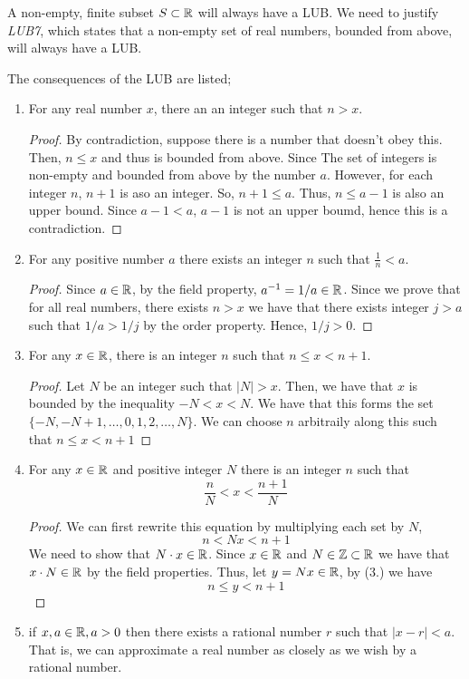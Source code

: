 A non-empty, finite subset $S \subset \mathbb{R}$ will always have a LUB. We need to justify \textit{LUB7}, which states that a non-empty set of real numbers, bounded from above, will always have a LUB. 

The consequences of the LUB are listed;
\begin{enumerate}[label=\arabic{*}.]
    \item For any real number $x$, there an an integer such that $n > x$. 
    \begin{proof}
        By contradiction, suppose there is a number that doesn't obey this. Then, $n \leq x$ and thus is bounded from above. Since The set of integers is non-empty and bounded from above by the number $a$. However, for each integer $n$, $n+1$ is aso an integer. So, $n + 1 \leq a$. Thus, $n \leq a-1$ is also an upper bound. Since $a -1 < a$, $a-1$ is not an upper boumd, hence this is a contradiction. 
    \end{proof}
    \item For any positive number $a$ there exists an integer $n$ such that $\frac{1}{n} < a$. 
    \begin{proof}
        Since $a \in \mathbb{R}$, by the field property, $a^{-1} = 1/a \in \mathbb{R}$. Since we prove that for all real numbers, there exists $n>x$ we have that there exists integer $j > a$ such that $1/a > 1/j$ by the order property. Hence, $1/j > 0$.
    \end{proof}
    \item For any $x\in \mathbb{R}$, there is an integer $n$ such that $n \leq x < n+1$.
    \begin{proof}
        Let $N$ be an integer such that $|N| > x$. Then, we have that $x$ is bounded by the inequality $-N < x < N$. We have that this forms the set $\{-N, -N + 1, \dots , 0, 1, 2, \dots, N\}$. We can choose $n$ arbitraily along this such that $n \leq x < n+1$
    \end{proof}
    \item For any $x\in \mathbb{R}$ and positive integer $N$ there is an integer $n$ such that \[\frac{n}{N} < x < \frac{n+1}{N}\]
    \begin{proof}
        We can first rewrite this equation by multiplying each set by $N$, \[n < Nx < n+1\]
        We need to show that $N\cdot x \in \mathbb{R}$. Since $x\in \mathbb{R}$ and $N \in \mathbb{Z} \subset \mathbb{R}$ we have that $x\cdot N \in \mathbb{R}$ by the field properties. Thus, let $y = Nx \in \mathbb{R}$, by (3.) we have \[n \leq y < n + 1\]
    \end{proof}
    \item if $x, a \in \mathbb{R}, a > 0$ then there exists a rational number $r$ such that $|x - r| < a$. That is, we can approximate a real number as closely as we wish by a rational number.

\end{enumerate}

